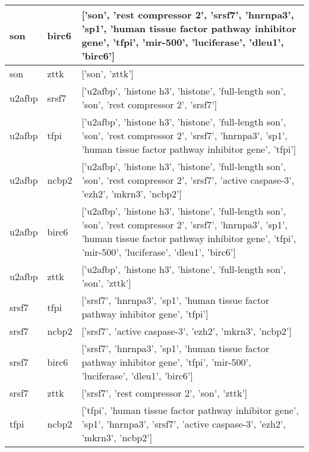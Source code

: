 \documentclass[12pt]{report}
\begin{document}
\begin{table}[!htb]
\begin{tabularx}{\textwidth}{|l|l|X|}
        \scriptsize{son} & \scriptsize{birc6} & \scriptsize{ ['son', 'rest compressor 2', 'srsf7', 'hnrnpa3', 'sp1', 'human tissue factor pathway inhibitor gene', 'tfpi', 'mir-500', 'luciferase', 'dleu1', 'birc6'] } \\ \hline
        \scriptsize{son} & \scriptsize{zttk} & \scriptsize{ ['son', 'zttk'] } \\ \hline
        \scriptsize{u2afbp} & \scriptsize{srsf7} & \scriptsize{ ['u2afbp', 'histone h3', 'histone', 'full-length son', 'son', 'rest compressor 2', 'srsf7'] } \\ \hline
        \scriptsize{u2afbp} & \scriptsize{tfpi} & \scriptsize{ ['u2afbp', 'histone h3', 'histone', 'full-length son', 'son', 'rest compressor 2', 'srsf7', 'hnrnpa3', 'sp1', 'human tissue factor pathway inhibitor gene', 'tfpi'] } \\ \hline
        \scriptsize{u2afbp} & \scriptsize{ncbp2} & \scriptsize{ ['u2afbp', 'histone h3', 'histone', 'full-length son', 'son', 'rest compressor 2', 'srsf7', 'active caspase-3', 'ezh2', 'mkrn3', 'ncbp2'] } \\ \hline
        \scriptsize{u2afbp} & \scriptsize{birc6} & \scriptsize{ ['u2afbp', 'histone h3', 'histone', 'full-length son', 'son', 'rest compressor 2', 'srsf7', 'hnrnpa3', 'sp1', 'human tissue factor pathway inhibitor gene', 'tfpi', 'mir-500', 'luciferase', 'dleu1', 'birc6'] } \\ \hline
        \scriptsize{u2afbp} & \scriptsize{zttk} & \scriptsize{ ['u2afbp', 'histone h3', 'histone', 'full-length son', 'son', 'zttk'] } \\ \hline
        \scriptsize{srsf7} & \scriptsize{tfpi} & \scriptsize{ ['srsf7', 'hnrnpa3', 'sp1', 'human tissue factor pathway inhibitor gene', 'tfpi'] } \\ \hline
        \scriptsize{srsf7} & \scriptsize{ncbp2} & \scriptsize{ ['srsf7', 'active caspase-3', 'ezh2', 'mkrn3', 'ncbp2'] } \\ \hline
        \scriptsize{srsf7} & \scriptsize{birc6} & \scriptsize{ ['srsf7', 'hnrnpa3', 'sp1', 'human tissue factor pathway inhibitor gene', 'tfpi', 'mir-500', 'luciferase', 'dleu1', 'birc6'] } \\ \hline
        \scriptsize{srsf7} & \scriptsize{zttk} & \scriptsize{ ['srsf7', 'rest compressor 2', 'son', 'zttk'] } \\ \hline
        \scriptsize{tfpi} & \scriptsize{ncbp2} & \scriptsize{ ['tfpi', 'human tissue factor pathway inhibitor gene', 'sp1', 'hnrnpa3', 'srsf7', 'active caspase-3', 'ezh2', 'mkrn3', 'ncbp2'] } \\ \hline

\end{tabularx}
\end{table}
\end{document}
